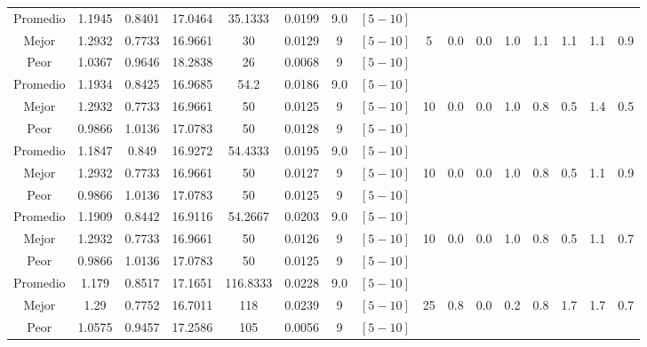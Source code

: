 \begin{table}[h!]
\begin{center}
\begin{tabular}{|c|c|c|c|c|c|c|c|c|c|c|c|c|c|c|c|}
            Promedio  & 1.1945 & 0.8401 & 17.0464 & 35.1333 & 0.0199 & 9.0 & $[5-10]$ &  &  &  &  &  &  &  & \\
            \cline{1-8}
            Mejor & 1.2932 & 0.7733  & 16.9661 & 30 & 0.0129 & 9 & $[5-10]$ & 5 & 0.0 & 0.0 & 1.0 & 1.1 & 1.1 & 1.1 & 0.9\\
            \cline{1-8}
            Peor & 1.0367 & 0.9646  & 18.2838 & 26 & 0.0068 & 9 & $[5-10]$ &  &  &  &  &  &  &  & \\
        \hline
        \hline
            Promedio  & 1.1934 & 0.8425 & 16.9685 & 54.2 & 0.0186 & 9.0 & $[5-10]$ &  &  &  &  &  &  &  & \\
            \cline{1-8}
            Mejor & 1.2932 & 0.7733  & 16.9661 & 50 & 0.0125 & 9 & $[5-10]$ & 10 & 0.0 & 0.0 & 1.0 & 0.8 & 0.5 & 1.4 & 0.5\\
            \cline{1-8}
            Peor & 0.9866 & 1.0136  & 17.0783 & 50 & 0.0128 & 9 & $[5-10]$ &  &  &  &  &  &  &  & \\
        \hline
        \hline
            Promedio  & 1.1847 & 0.849 & 16.9272 & 54.4333 & 0.0195 & 9.0 & $[5-10]$ &  &  &  &  &  &  &  & \\
            \cline{1-8}
            Mejor & 1.2932 & 0.7733  & 16.9661 & 50 & 0.0127 & 9 & $[5-10]$ & 10 & 0.0 & 0.0 & 1.0 & 0.8 & 0.5 & 1.1 & 0.9\\
            \cline{1-8}
            Peor & 0.9866 & 1.0136  & 17.0783 & 50 & 0.0125 & 9 & $[5-10]$ &  &  &  &  &  &  &  & \\
        \hline
        \hline
            Promedio  & 1.1909 & 0.8442 & 16.9116 & 54.2667 & 0.0203 & 9.0 & $[5-10]$ &  &  &  &  &  &  &  & \\
            \cline{1-8}
            Mejor & 1.2932 & 0.7733  & 16.9661 & 50 & 0.0126 & 9 & $[5-10]$ & 10 & 0.0 & 0.0 & 1.0 & 0.8 & 0.5 & 1.1 & 0.7\\
            \cline{1-8}
            Peor & 0.9866 & 1.0136  & 17.0783 & 50 & 0.0125 & 9 & $[5-10]$ &  &  &  &  &  &  &  & \\
        \hline
        \hline
            Promedio  & 1.179 & 0.8517 & 17.1651 & 116.8333 & 0.0228 & 9.0 & $[5-10]$ &  &  &  &  &  &  &  & \\
            \cline{1-8}
            Mejor & 1.29 & 0.7752  & 16.7011 & 118 & 0.0239 & 9 & $[5-10]$ & 25 & 0.8 & 0.0 & 0.2 & 0.8 & 1.7 & 1.7 & 0.7\\
            \cline{1-8}
            Peor & 1.0575 & 0.9457  & 17.2586 & 105 & 0.0056 & 9 & $[5-10]$ &  &  &  &  &  &  &  & \\

\end{tabular}
\end{center}
\end{table}
